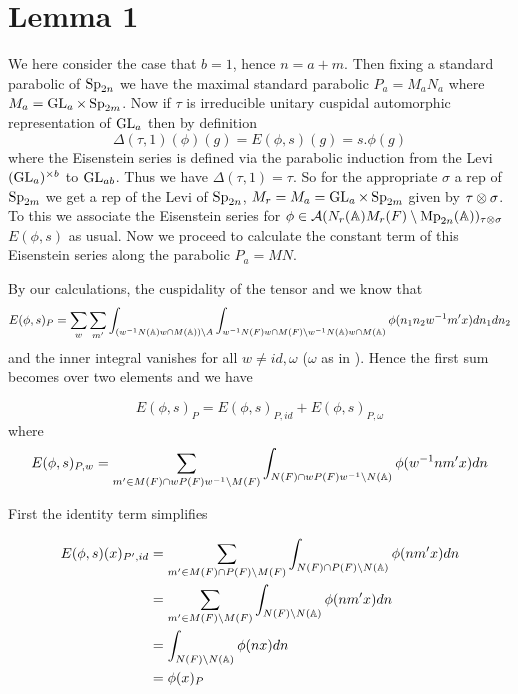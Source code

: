 \section{Lemma 1}
We here consider the case that \(b=1\), hence \(n = a + m\). Then fixing a standard parabolic of \(\operatorname{Sp}_{2n}\) we have the maximal standard parabolic \(P_a = M_aN_a\) where \(M_a = \operatorname{GL}_a \times \operatorname{Sp}_{2m}\).  Now if \(\tau\) is irreducible unitary cuspidal automorphic representation of \(\operatorname{GL}_a\) then by definition 
\[\Delta(\tau, 1)(\phi)(g) = E(\phi,s)(g) = s.\phi(g)\]
where the Eisenstein series is defined via the parabolic induction from the Levi \((\operatorname{GL}_a)^{\times b} \) to \(\operatorname{GL}_{ab}\). Thus we have \(\Delta(\tau, 1) = \tau\). So for the appropriate \(\sigma \) a rep of \(\operatorname{Sp}_{2m}\) we get a rep of the Levi of \(\operatorname{Sp}_{2n}\), \(M_r = M_a = \operatorname{GL}_a\times \operatorname{Sp}_{2m}\) given by \(\tau\otimes \sigma\). To this we associate the Eisenstein series for \(\phi\in \mathcal{A}(N_r(\A)M_r(F)\setminus \Mp_{2n}(\A))_{\tau\tensor \sigma}\) \(E(\phi,s)\) as usual. Now we proceed to calculate the constant term of this Eisenstein series along the parabolic \(P_a = MN\). 

By our calculations, the cuspidality of the tensor and \cite{jiangPolesCertainResidual2013} we know that 
     \[E(\phi, s)_{P} = \sum_{ w} \sum_{m'} \int_{(w\inv N(\A)w \cap M(\A)) \setminus A} \int_{w\inv N(F) w \cap M(F) \setminus w\inv N(\A)w \cap M(\A)} \phi( n_1 n_2 w\inv m' x)  dn_1 dn_2\] 
     and the inner integral vanishes for all \(w\neq id, \omega\) (\(\omega\) as in \cite{jiangPolesCertainResidual2013}). Hence the first sum becomes over two elements and we have 

     \[E(\phi, s)_{P} = E(\phi, s)_{P, id} + E(\phi, s)_{P, \omega}\]
     where 
     \[E(\phi, s)_{P, w} =  \sum_{m'\in M(F)\cap wP(F)w\inv\setminus M(F)} \int_{N(F)\cap wP(F)w\inv \setminus N(\A)} \phi( w\inv nm' x)  dn\]

First the identity term simplifies

     \begin{equation*}
        \begin{aligned}
            E(\phi, s)(x)_{P', id} &=  \sum_{m'\in M(F)\cap P(F)\setminus M(F)} \int_{N(F)\cap P(F) \setminus N(\A)} \phi( nm' x)  dn\\
            &= \sum_{m'\in M(F)\setminus M(F)} \int_{N(F)\setminus N(\A)} \phi( nm' x)  dn \\
            &=\int_{N(F)\setminus N(\A)} \phi( n x)  dn \\
            &= \phi(x)_P
        \end{aligned}
     \end{equation*}

